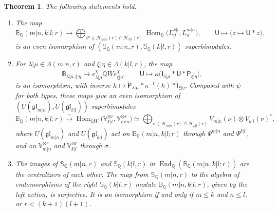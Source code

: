 \documentclass[11pt,a4paper]{amsart}
\newtheorem{theorem}{Theorem}[section]
\theoremstyle{definition}
\theoremstyle{remark}
\newcommand{\Q}{\mathbb Q}
\newcommand{\bS}{\mathbb S}
\newcommand{\bB}{\mathbb B}
\newcommand{\End}{\operatorname{End}}
\newcommand{\Hom}{\operatorname{Hom}}
\newcommand{\lm}{\lambda|\mu}
\newcommand{\xh}{\xi|\eta}
\numberwithin{equation}{section}
\begin{document}
\begin{theorem}\label{thm:howe}
The following statements hold.
\begin{enumerate}
\item The map
\begin{equation}\label{eq:howe-geometric}
\bB_\Q(m|n,k|l;r)\longrightarrow
\bigoplus_{\vartheta'\in\mathcal H_{m|n}(r)\cap\mathcal H_{k|l}(r)}
\Hom_\Q\bigl(L^{k|l}_\vartheta,L^{m|n}_\vartheta\bigr),\qquad
\mathsf U\longmapsto\bigl(z\mapsto\mathsf U*z\bigr),
\end{equation}
is an even isomorphism of $(\bS_\Q(m|n,r),\bS_\Q(k|l,r))$-superbimodules.
\item For $\lm\in\Lambda(m|n,r)$ and $\xh\in\Lambda(k|l,r)$, the map
\begin{equation}\label{eq:howe-algebraic}
\bB_{\lm,\xh}\longrightarrow e^\chi_{\lm}\Q We^\chi_{\xh},\qquad
\mathsf U\longmapsto\kappa\bigl(\widetilde{\mathsf I}_{\lm}*\mathsf U
*\widetilde{\mathsf P}_{\xh}\bigr),
\end{equation}
is an isomorphism, with inverse
$h\mapsto\widetilde{\mathsf P}_{\lm}*\kappa^{-1}(h)*\widetilde{\mathsf I}_{\xh}$.
Composed with $\psi$ for both types, these maps give an even isomorphism
of $(U(\mathfrak{gl}_{m|n}),U(\mathfrak{gl}_{k|l}))$-superbimodules
\begin{equation}\label{eq:howe-tensor}
\bB_\Q(m|n,k|l;r)\xrightarrow{\ \sim\ }
\Hom_{\Q W}\bigl(\mathbb V_{k|l}^{\otimes r},\mathbb V_{m|n}^{\otimes r}\bigr)
\simeq\bigoplus_{\nu\in\mathcal H_{m|n}(r)\cap\mathcal H_{k|l}(r)}
V_{m|n}(\nu)\otimes V_{k|l}(\nu)^*,
\end{equation}
where $U(\mathfrak{gl}_{m|n})$ and $U(\mathfrak{gl}_{k|l})$ act on
$\bB_\Q(m|n,k|l;r)$ through $\Psi^{m|n}$ and $\Psi^{k|l}$, and on
$\mathbb V_{m|n}^{\otimes r}$ and $\mathbb V_{k|l}^{\otimes r}$ through
$\sigma$.
\item The images of $\bS_\Q(m|n,r)$ and $\bS_\Q(k|l,r)$ in $\End_\Q(\bB_\Q(m|n,k|l;r))$ are
the centralizers of each other. The map from $\bS_\Q(m|n,r)$ to the algebra of
endomorphisms of the right $\bS_\Q(k|l,r)$-module $\bB_\Q(m|n,k|l;r)$, given by the
left action, is surjective. It is an isomorphism if and only if
$m\leq k$ and $n\leq l$, or $r<(k+1)(l+1)$.
\end{enumerate}
\end{theorem}
\end{document}
